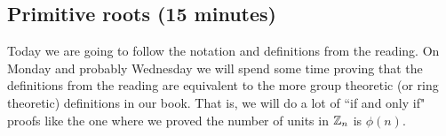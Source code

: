 \documentclass[letterpaper, 11 pt]{article}
\begin{document}
%
%
%
% 
% 
%
\subsection{Primitive roots (15 minutes)}
Today we are going to follow the notation and definitions from the reading. On Monday and probably Wednesday we will spend some time proving that the definitions from the reading are equivalent to the more group theoretic (or ring theoretic) definitions in our book. That is, we will do a lot of ``if and only if" proofs like the one where we proved the number of units in $\mathbb Z_n$ is $\phi(n)$.
\end{document}
